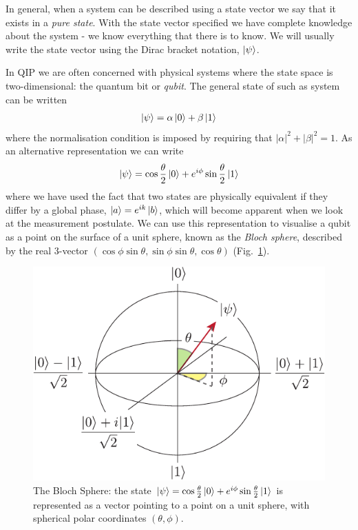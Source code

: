 In general, when a system can be described using a state vector we say that it exists in a \textit{pure state}. With the state vector specified we have complete knowledge about the system - we know everything that there is to know. We will usually write the state vector using the Dirac bracket notation, $\left\vert\psi\right\rangle$. 

In QIP we are often concerned with physical systems where the state space is two-dimensional: the quantum bit or \textit{qubit}. The general state of such as system can be written
\begin{align}
  \left\vert\psi\right\rangle = \alpha\left\vert0\right\rangle + \beta\left\vert1\right\rangle
\end{align}
where the normalisation condition is imposed by requiring that $|\alpha|^2 + |\beta|^2 = 1$. As an alternative representation we can write
\begin{align}
  \left\vert\psi\right\rangle = \cos\frac{\theta}{2}\left\vert0\right\rangle + e^{i\phi}\sin\frac{\theta}{2}\left\vert1\right\rangle
\end{align}
where we have used the fact that two states are physically equivalent if they differ by a global phase, $\left\vert a\right\rangle = e^{ik}\left\vert b\right\rangle$, which will become apparent when we look at the measurement postulate. We can use this representation to visualise a qubit as a point on the surface of a unit sphere, known as the \textit{Bloch sphere}, described by the real $3$-vector $(\cos\phi\sin\theta, \sin\phi\sin\theta, \cos\theta)$ (Fig.~\ref{bloch_sphere}).

\begin{figure}[htb]
  \begin{center}
    \includegraphics{figures/bloch_sphere.pdf}
  \end{center}
  \caption{The Bloch Sphere: the state $\left\vert\psi\right\rangle =  \cos\frac{\theta}{2}\left\vert0\right\rangle + e^{i\phi}\sin\frac{\theta}{2}\left\vert1\right\rangle$ is represented as a vector pointing to a point on a unit sphere, with spherical polar coordinates $(\theta, \phi)$. }
  \label{bloch_sphere}
\end{figure}

